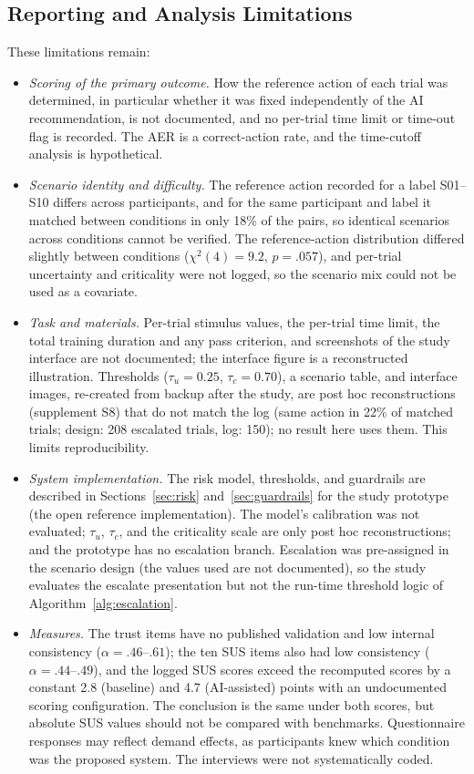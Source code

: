 \documentclass[journal]{IEEEtran}
\theoremstyle{plain}
\theoremstyle{definition}
\begin{document}
    \subsection{Reporting and Analysis Limitations}
    \label{sec:lim_reporting}
    These limitations remain:
    \begin{itemize}
        \item \emph{Scoring of the primary outcome.} How the reference action of each trial was determined, in particular whether it was fixed independently of the AI recommendation, is not documented, and no per-trial time limit or time-out flag is recorded. The AER is a correct-action rate, and the time-cutoff analysis is hypothetical.
        \item \emph{Scenario identity and difficulty.} The reference action recorded for a label S01--S10 differs across participants, and for the same participant and label it matched between conditions in only 18\% of the pairs, so identical scenarios across conditions cannot be verified. The reference-action distribution differed slightly between conditions ($\chi^2(4)=9.2$, $p=.057$), and per-trial uncertainty and criticality were not logged, so the scenario mix could not be used as a covariate.
        \item \emph{Task and materials.} Per-trial stimulus values, the per-trial time limit, the total training duration and any pass criterion, and screenshots of the study interface are not documented; the interface figure is a reconstructed illustration. Thresholds ($\tau_u = 0.25$, $\tau_c = 0.70$), a scenario table, and interface images, re-created from backup after the study, are post hoc reconstructions (supplement S8) that do not match the log (same action in 22\% of matched trials; design: 208 escalated trials, log: 150); no result here uses them. This limits reproducibility.
        \item \emph{System implementation.} The risk model, thresholds, and guardrails are described in Sections~\ref{sec:risk} and~\ref{sec:guardrails} for the study prototype (the open reference implementation). The model's calibration was not evaluated; $\tau_u$, $\tau_c$, and the criticality scale are only post hoc reconstructions; and the prototype has no escalation branch. Escalation was pre-assigned in the scenario design (the values used are not documented), so the study evaluates the escalate presentation but not the run-time threshold logic of Algorithm~\ref{alg:escalation}.
        \item \emph{Measures.} The trust items have no published validation and low internal consistency ($\alpha = .46$--$.61$); the ten SUS items also had low consistency ($\alpha = .44$--$.49$), and the logged SUS scores exceed the recomputed scores by a constant 2.8 (baseline) and 4.7 (AI-assisted) points with an undocumented scoring configuration. The conclusion is the same under both scores, but absolute SUS values should not be compared with benchmarks. Questionnaire responses may reflect demand effects, as participants knew which condition was the proposed system. The interviews were not systematically coded.

\end{itemize}
\end{document}

